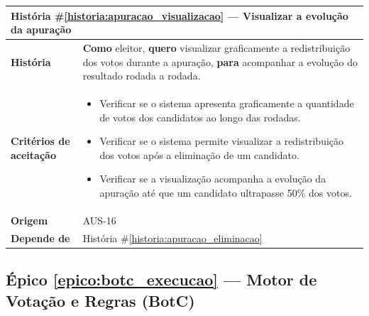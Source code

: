 \documentclass[12pt,a4paper]{article}
\newcounter{epico}
\newcounter{historia}
\begin{document}
\label{historia:apuracao_visualizacao}
\begin{table}[H]
    \centering
    \begin{tabular}{|m{4.5cm}|m{11cm}|}
    \hline

    \multicolumn{2}{|l|}{
        \textbf{História \#\ref{historia:apuracao_visualizacao} --- Visualizar a evolução da apuração}
    } \\

    \hline

    \textbf{História} &
    \textbf{Como} eleitor,
    \newline
    \textbf{quero} visualizar graficamente a redistribuição dos votos durante a apuração,
    \newline
    \textbf{para} acompanhar a evolução do resultado rodada a rodada. \\

    \textbf{Critérios de aceitação} &
    \begin{itemize}
        \item{Verificar se o sistema apresenta graficamente a quantidade de votos dos candidatos ao longo das rodadas.}
        \item{Verificar se o sistema permite visualizar a redistribuição dos votos após a eliminação de um candidato.}
        \item{Verificar se a visualização acompanha a evolução da apuração até que um candidato ultrapasse 50\% dos votos.}
    \end{itemize}\\

    \textbf{Origem} &
    AUS-16 \\

    \textbf{Depende de} &
    História \#\ref{historia:apuracao_eliminacao} \\

    \hline
    \end{tabular}
\end{table}

\vspace{0.5cm}

\vspace{0.5cm}

\label{epico:botc_execucao}
\subsection*{Épico \ref{epico:botc_execucao} --- Motor de Votação e Regras (BotC)}
\end{document}

